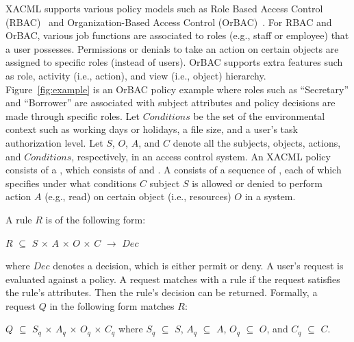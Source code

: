 XACML supports various policy models such as Role Based Access Control (RBAC)~\cite{anderson04:rbacxacml,ferraiolo01:proposed} and Organization-Based Access 
Control (OrBAC)~\cite{kalam03:orBac}. For RBAC and OrBAC, various job functions are associated to roles (e.g., staff or employee) that a user possesses. 
Permissions or denials to take an action on certain objects are assigned to specific roles (instead of users). OrBAC supports 
extra features such as role, activity (i.e., action), and view (i.e., object) hierarchy. Figure~\ref{fig:example} is an OrBAC policy example where 
roles such as ``Secretary'' and ``Borrower'' are associated with subject attributes and policy decisions are made through 
specific roles.
Let $Conditions$ be the set of the environmental context
such as working days or holidays, a file size, and a user's task authorization level. 
Let $S$, $O$, $A$, and $C$ denote all the subjects,
objects, actions, and  $Conditions$, respectively, in an access control system.
An XACML policy consists of a , which consists
of  and . A  consists
of a sequence of , each of which
specifies under what conditions $C$ subject $S$ is allowed or denied
to perform action $A$ (e.g., read) on certain object (i.e., resources) $O$ in a system.

A rule $R$ is of the following form:
\begin{center}
$R$ $\subseteq$ $S$ $\times$ $A$ $\times$ $O$ $\times$ $C$ $\longrightarrow$ $Dec$
\end{center}
where $Dec$ denotes a decision, which is either permit or deny.
A user's request is evaluated against a policy.
A request matches with a rule if the request satisfies the rule's
attributes. Then the rule's decision can be returned.
Formally, a request $Q$ in the following form matches $R$:
\begin{center}
$Q$ $\subseteq$ $S_q$ $\times$ $A_q$ $\times$ $O_q$ $\times$ $C_q$ where $S_q$ $\subseteq$ $S$, $A_q$ $\subseteq$ $A$, $O_q$ $\subseteq$ $O$, and $C_q$ $\subseteq$ $C$.
\end{center}



